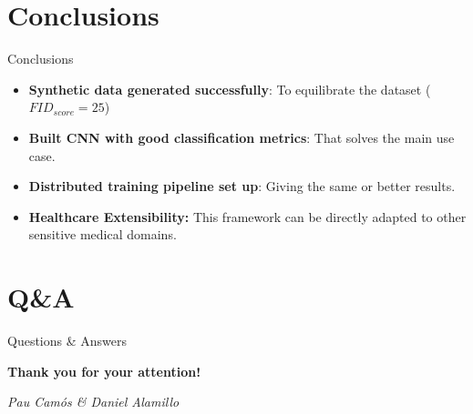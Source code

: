 \documentclass[aspectratio=169]{iticslides}
\begin{document}
\section{Conclusions}

\begin{frame}{Conclusions}
  \begin{itemize}
  \item \textbf{Synthetic data generated successfully}: To
    equilibrate the dataset ($FID_{score} = 25$)

    \vspace{0.3cm}
    
  \item \textbf{Built CNN with good classification metrics}: That
    solves the main use case.

    \vspace{0.3cm}
    
  \item \textbf{Distributed training pipeline set up}: Giving the same
    or better results.
    
    \vspace{0.3cm}
  \item \textbf{Healthcare Extensibility:} This framework can be
    directly adapted to other sensitive medical domains.
    
  \end{itemize}
\end{frame}


\section{Q\&A}

\begin{frame}{Questions \& Answers}
  \begin{center}
    \vspace{1cm}
    {\LARGE \textbf{Thank you for your attention!}}
    
    \vspace{1.5cm}
    \textit{Pau Camós \& Daniel Alamillo}
  \end{center}
\end{frame}
\end{document}
